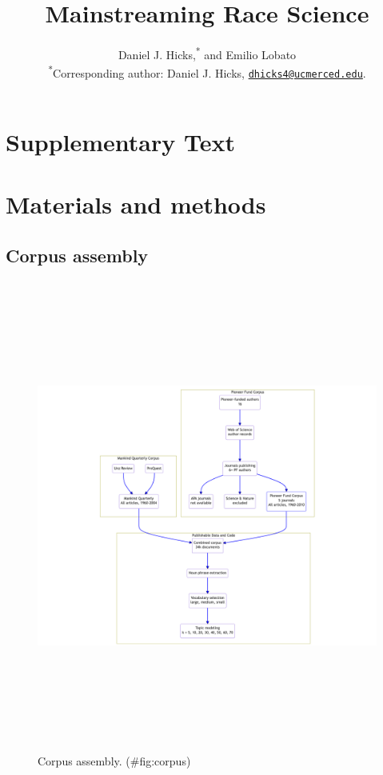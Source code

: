 \documentclass[12pt]{article}
\title{\bf Mainstreaming Race Science}
\author{
Daniel J. Hicks,\textsuperscript{*}
and Emilio Lobato
\\\textsuperscript{*}Corresponding author: Daniel J. Hicks, \href{mailto:dhicks4@ucmerced.edu}{\nolinkurl{dhicks4@ucmerced.edu}}.
}
\date{}
\begin{document}
\maketitle
\section*{Supplementary Text}
\renewcommand{\thesection}{S\arabic{section}}
\hypertarget{materials-and-methods}{%
\section*{Materials and methods}\label{materials-and-methods}}

\hypertarget{corpus-assembly}{%
\subsection*{Corpus assembly}\label{corpus-assembly}}

\begin{figure}
\centering
\includegraphics[width=8in,height=6.1in]{img/dataset.png}
\caption{Corpus assembly. (\#fig:corpus)}
\end{figure}
\end{document}
